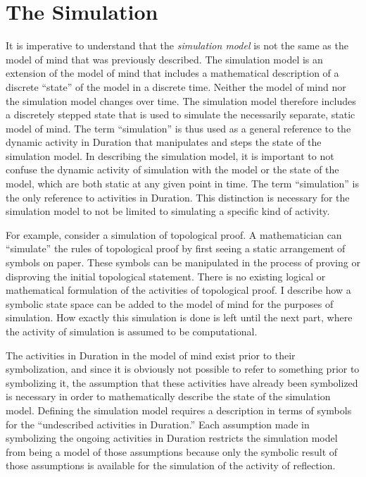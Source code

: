 \chapter{The Simulation}
\label{chapter:the_simulation}

It is imperative to understand that the \emph{simulation model} is not
the same as the model of mind that was previously described.  The
simulation model is an extension of the model of mind that includes a
mathematical description of a discrete ``state'' of the model in a
discrete time.  Neither the model of mind nor the simulation model
changes over time.  The simulation model therefore includes a
discretely stepped state that is used to simulate the necessarily
separate, static model of mind.  The term ``simulation'' is thus used
as a general reference to the dynamic activity in Duration that
manipulates and steps the state of the simulation model.  In
describing the simulation model, it is important to not confuse the
dynamic activity of simulation with the model or the state of the
model, which are both static at any given point in time.  The term
``simulation'' is the only reference to activities in Duration.  This
distinction is necessary for the simulation model to not be limited to
simulating a specific kind of activity.

For example, consider a simulation of topological proof.  A
mathematician can ``simulate'' the rules of topological proof by first
seeing a static arrangement of symbols on paper.  These symbols can be
manipulated in the process of proving or disproving the initial
topological statement.  There is no existing logical or mathematical
formulation of the activities of topological proof.  I describe how a
symbolic state space can be added to the model of mind for the
purposes of simulation.  How exactly this simulation is done is left
until the next part, where the activity of simulation is assumed to be
computational.

The activities in Duration in the model of mind exist prior to their
symbolization, and since it is obviously not possible to refer to
something prior to symbolizing it, the assumption that these
activities have already been symbolized is necessary in order to
mathematically describe the state of the simulation model.  Defining
the simulation model requires a description in terms of symbols for
the ``undescribed activities in Duration.''  Each assumption made in
symbolizing the ongoing activities in Duration restricts the
simulation model from being a model of those assumptions because only
the symbolic result of those assumptions is available for the
simulation of the activity of reflection.

